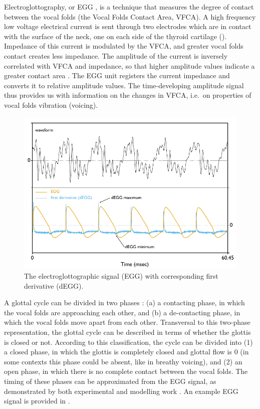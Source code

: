 \documentclass[
  11pt,
  a4paper,
]{article}
\begin{document}
Electroglottography, or EGG \citep{fabre1957}, is a technique that
measures the degree of contact between the vocal folds (the Vocal Folds
Contact Area, VFCA). A high frequency low voltage electrical current is
sent through two electrodes which are in contact with the surface of the
neck, one on each side of the thyroid cartilage ().
Impedance of this current is modulated by the VFCA, and greater vocal
folds contact creates less impedance. The amplitude of the current is
inversely correlated with VFCA and impedance, so that higher amplitude
values indicate a greater contact area \citep{titze1990}. The EGG unit
registers the current impedance and converts it to relative amplitude
values. The time-developing amplitude signal thus provides us with
information on the changes in VFCA, i.e.~on properties of vocal folds
vibration (voicing).

\begin{figure}
  \centering
  \includegraphics{./img/degg-signal.pdf}
  \caption{The electroglottographic signal (EGG) with corresponding first derivative (dEGG).}
  \label{f:egg}
\end{figure}

A glottal cycle can be divided in two phases
\citep{childers1985, hampala2016}: (a) a contacting phase, in which the
vocal folds are approaching each other, and (b) a de-contacting phase,
in which the vocal folds move apart from each other. Transversal to this
two-phase representation, the glottal cycle can be described in terms of
whether the glottis is closed or not. According to this classification,
the cycle can be divided into (1) a closed phase, in which the glottis
is completely closed and glottal flow is 0 (in some contexts this phase
could be absent, like in breathy voicing), and (2) an open phase, in
which there is no complete contact between the vocal folds. The timing
of these phases can be approximated from the EGG signal, as demonstrated
by both experimental and modelling work \citep{hampala2016}. An example
EGG signal is provided in .
\end{document}
